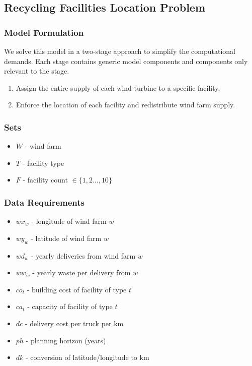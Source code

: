\subsection{Recycling Facilities Location Problem }
\subsubsection{Model Formulation}
We solve this model in a two-stage approach to simplify the computational demands. Each stage contains generic model components and components only relevant to the stage.
\begin{enumerate}[noitemsep]
   \item Assign the entire supply of each wind turbine to a specific facility. 
   \item  Enforce the location of each facility and redistribute wind farm supply.
\end{enumerate}


\subsubsection{Sets}
\begin{itemize} [noitemsep]
    \item $W$ - wind farm
    \item $T$ - facility type
    \item $F$ - facility count $ \in \{1,2...,10 \} $
\end{itemize}


\newpage
\subsubsection{Data Requirements}
\begin{multicols}{2}
\begin{itemize} [noitemsep]
    \item $wx_{w}$ - longitude of wind farm $w$
    \item $wy_{w}$ - latitude of wind farm $w$
    \item $wd_{w}$ - yearly deliveries from wind farm $w$
    \item $ww_{w}$ - yearly waste per delivery from $w$

    \item $co_{t}$ - building cost of facility of type $t$
    \item $ca_{t}$ - capacity of facility of type $t$

    \item $dc$ - delivery cost per truck per km
    \item $ph$ - planning horizon (years)
    \item $dk$ - conversion of latitude/longitude to km
\end{itemize}
\end{multicols}


